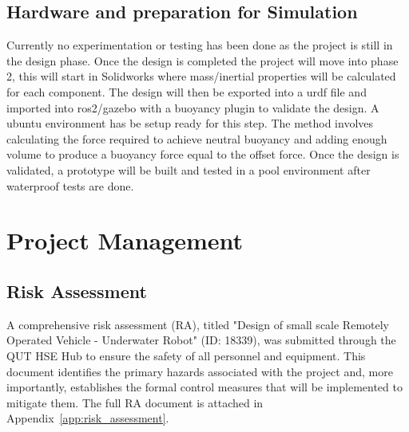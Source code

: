 \documentclass[11pt, a4paper]{article}
\begin{document}
\subsection{Hardware and preparation for Simulation}
Currently no experimentation or testing has been done as the project is still in the design phase. Once the design is completed the project will move into phase 2, this will start in Solidworks where mass/inertial properties will be calculated for each component.
The design will then be exported into a urdf file and imported into ros2/gazebo with a buoyancy plugin to validate the design. A ubuntu environment has be setup ready for this step. The method involves calculating the force required to achieve neutral buoyancy and adding enough volume to produce a buoyancy force equal to the offset force.
Once the design is validated, a prototype will be built and tested in a pool environment after waterproof tests are done.





































\section{Project Management}
\label{sec:management}


\subsection{Risk Assessment}
\label{sec:risk_assessment}

A comprehensive risk assessment (RA), titled "Design of small scale Remotely Operated Vehicle - Underwater Robot" (ID: 18339), was submitted through the QUT HSE Hub to ensure the safety of all personnel and equipment. This document identifies the primary hazards associated with the project and, more importantly, establishes the formal control measures that will be implemented to mitigate them. The full RA document is attached in Appendix~\ref{app:risk_assessment}.
\end{document}

